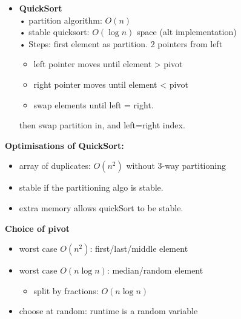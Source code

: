 \documentclass[10pt, landscape]{article}
\begin{document}
\begin{multicols}{4}
\begin{itemize}
    \item \textbf{QuickSort}
	\\ • partition algorithm: $O(n)$
    	\\ • stable quicksort: $O(\log n)$ space (alt implementation)
	\\ • Steps: first element as partition. 2 pointers from left 
            \begin{itemize}
                \item left pointer moves until element > pivot
                \item right pointer moves until element < pivot
                \item swap elements until left = right. 
            \end{itemize}
            then swap partition in, and left=right index.
\end{itemize}

\textbf{Optimisations of QuickSort:}
\begin{itemize}
    \item array of duplicates: $O(n^2)$ without 3-way partitioning
    \item stable if the partitioning algo is stable.
    \item extra memory allows quickSort to be stable.
\end{itemize}

\textbf{Choice of pivot}
\begin{itemize}
    \item worst case $O(n^2)$: first/last/middle element
    \item worst case $O(n\log n)$: median/random element
    \begin{itemize}
        \item split by fractions: $O(n\log n)$
    \end{itemize}
    \item choose at random: runtime is a random variable
\end{itemize}



\end{multicols}
\end{document}
